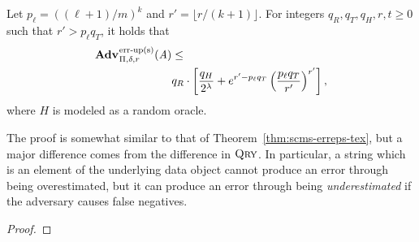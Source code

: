 \begin{theorem}
Let $p_\ell = ((\ell+1)/m)^k$ and $r' = \lfloor r/(k+1) \rfloor$. For integers $q_R, q_T, q_H, r, t \geq 0$ such
that $r' > p_\ell q_T$, it holds that
  \begin{equation*}
  \begin{aligned}
   \Adv{\erreps}_{\Pi,\delta,r}(\advA) &\leq\\
     & q_R \cdot \left[\frac{q_H}{2^\lambda} + e^{r'-p_\ell q_T}\left(\frac{p_\ell q_T}{r'}\right)^{r'}\right],
  \end{aligned}
\end{equation*}
where $H$ is modeled as a random oracle.
\end{theorem}
The proof is somewhat similar to that of Theorem~\ref{thm:scms-erreps-tex},
but a major difference comes from the difference in $\textnormal{\textsc{Qry}}$. In particular,
a string which is an element of the underlying data object cannot
produce an error through being overestimated, but it can produce an error
through being \emph{underestimated} if the adversary causes false negatives.
\begin{proof}
  
\end{proof}